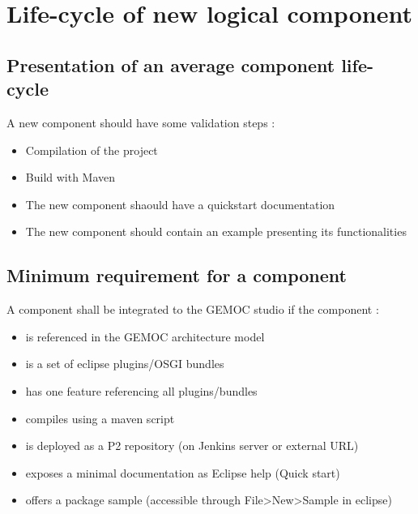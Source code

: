\documentclass{gemoc} %
\begin{document}
\section{Life-cycle of new logical component}
\subsection{Presentation of an average component life-cycle}
A new component should have some validation steps :
\begin{itemize}
	\item Compilation of the project
	\item Build with Maven
	\item The new component shaould have a quickstart documentation
	\item The new component should contain an example presenting its functionalities
\end{itemize}
\subsection{Minimum requirement for a component}
A component shall be integrated to the GEMOC studio if the component : 
\newline
\begin{itemize}
	\item is referenced in the GEMOC architecture model
	\item is a set of eclipse plugins/OSGI bundles
	\item has one feature referencing all plugins/bundles
	\item compiles using a maven script
	\item is deployed as a P2 repository (on Jenkins server or external URL)
	\item exposes a minimal documentation as Eclipse help (Quick start)
	\item offers a package sample (accessible through File\textgreater New\textgreater Sample in eclipse)
\end{itemize}

\end{document}
